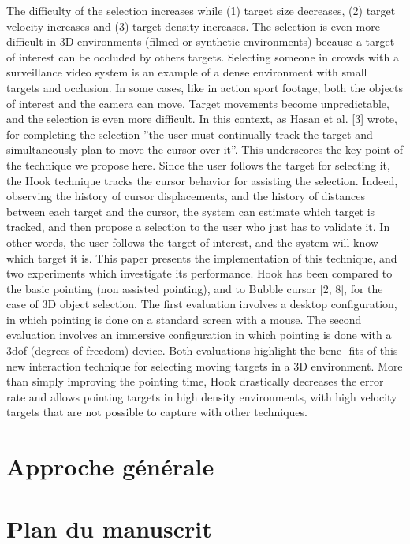  The
difficulty of the selection increases while (1) target size decreases,
(2) target velocity increases and (3) target density increases. The
selection is even more difficult in 3D environments (filmed or synthetic
environments) because a target of interest can be occluded
by others targets. Selecting someone in crowds with a surveillance
video system is an example of a dense environment with small targets
and occlusion. In some cases, like in action sport footage, both
the objects of interest and the camera can move. Target movements
become unpredictable, and the selection is even more difficult.
In this context, as Hasan et al. [3] wrote, for completing the
selection ”the user must continually track the target and simultaneously
plan to move the cursor over it”. This underscores the key
point of the technique we propose here. Since the user follows the
target for selecting it, the Hook technique tracks the cursor behavior
for assisting the selection. Indeed, observing the history of cursor
displacements, and the history of distances between each target and
the cursor, the system can estimate which target is tracked, and then
propose a selection to the user who just has to validate it. In other
words, the user follows the target of interest, and the system will
know which target it is.
This paper presents the implementation of this technique, and
two experiments which investigate its performance. Hook has been
compared to the basic pointing (non assisted pointing), and to Bubble
cursor [2, 8], for the case of 3D object selection. The first evaluation
involves a desktop configuration, in which pointing is done
on a standard screen with a mouse. The second evaluation involves
an immersive configuration in which pointing is done with a 3dof
(degrees-of-freedom) device. Both evaluations highlight the bene-
fits of this new interaction technique for selecting moving targets in
a 3D environment. More than simply improving the pointing time,
Hook drastically decreases the error rate and allows pointing targets
in high density environments, with high velocity targets that are not
possible to capture with other techniques.


 
\section*{Approche générale}


\section*{Plan du manuscrit}
